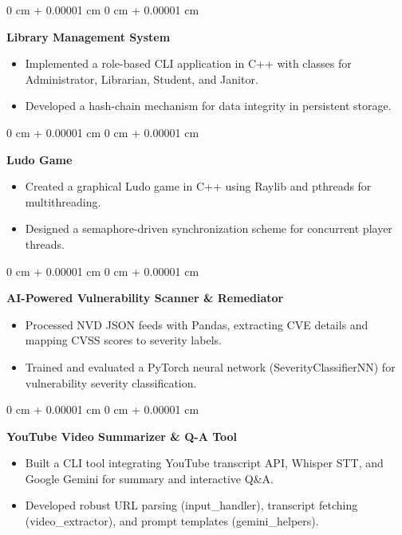 \documentclass[10pt, letterpaper]{article}
\newenvironment{highlights}{
    \begin{itemize}[
        topsep=0.10 cm,
        parsep=0.10 cm,
        partopsep=0pt,
        itemsep=0pt,
        leftmargin=0 cm + 10pt
    ]
}{
    \end{itemize}
}
\newenvironment{onecolentry}{
    \begin{adjustwidth}{
        0 cm + 0.00001 cm
    }{
        0 cm + 0.00001 cm
    }
}{
    \end{adjustwidth}
}
\begin{document}
\begin{onecolentry}
    \textbf{Library Management System}
    \begin{highlights}
        \item Implemented a role-based CLI application in C++ with classes for Administrator, Librarian, Student, and Janitor.
        \item Developed a hash-chain mechanism for data integrity in persistent storage.
    \end{highlights}
\end{onecolentry}
\vspace{0.10 cm}

\begin{onecolentry}
    \textbf{Ludo Game}
    \begin{highlights}
        \item Created a graphical Ludo game in C++ using Raylib and pthreads for multithreading.
        \item Designed a semaphore-driven synchronization scheme for concurrent player threads.
    \end{highlights}
\end{onecolentry}
\vspace{0.10 cm}

\begin{onecolentry}
    \textbf{AI-Powered Vulnerability Scanner & Remediator}
    \begin{highlights}
        \item Processed NVD JSON feeds with Pandas, extracting CVE details and mapping CVSS scores to severity labels.
        \item Trained and evaluated a PyTorch neural network (SeverityClassifierNN) for vulnerability severity classification.
    \end{highlights}
\end{onecolentry}
\vspace{0.10 cm}

\begin{onecolentry}
    \textbf{YouTube Video Summarizer & Q-A Tool}
    \begin{highlights}
        \item Built a CLI tool integrating YouTube transcript API, Whisper STT, and Google Gemini for summary and interactive Q\&A.
        \item Developed robust URL parsing (input\_handler), transcript fetching (video\_extractor), and prompt templates (gemini\_helpers).
    \end{highlights}
\end{onecolentry}
\end{document}
